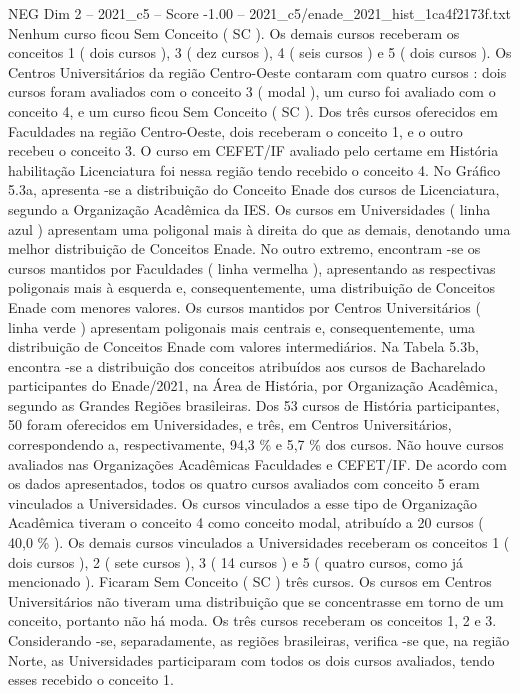 \begin{textsample}{NEG Dim 2 – 2021\_c5 – Score -1.00 – 2021\_c5/enade\_2021\_hist\_1ca4f2173f.txt}
Nenhum curso ficou Sem Conceito ( SC ).
Os demais cursos receberam os conceitos 1 ( dois cursos ), 3 ( dez cursos ), 4 ( seis cursos ) e 5 ( dois cursos ).
Os Centros Universitários da região Centro-Oeste contaram com quatro cursos : dois cursos foram avaliados com o conceito 3 ( modal ), um curso foi avaliado com o conceito 4, e um curso ficou Sem Conceito ( SC ).
Dos três cursos oferecidos em Faculdades na região Centro-Oeste, dois receberam o conceito 1, e o outro recebeu o conceito 3.
O curso em CEFET/IF avaliado pelo certame em História habilitação Licenciatura foi nessa região tendo recebido o conceito 4.
No Gráfico 5.3a, apresenta -se a distribuição do Conceito Enade dos cursos de Licenciatura, segundo a Organização Acadêmica da IES.
Os cursos em Universidades ( linha azul ) apresentam uma poligonal mais à direita do que as demais, denotando uma melhor distribuição de Conceitos Enade.
No outro extremo, encontram -se os cursos mantidos por Faculdades ( linha vermelha ), apresentando as respectivas poligonais mais à esquerda e, consequentemente, uma distribuição de Conceitos Enade com menores valores.
Os cursos mantidos por Centros Universitários ( linha verde ) apresentam poligonais mais centrais e, consequentemente, uma distribuição de Conceitos Enade com valores intermediários.
Na Tabela 5.3b, encontra -se a distribuição dos conceitos atribuídos aos cursos de Bacharelado participantes do Enade/2021, na Área de História, por Organização Acadêmica, segundo as Grandes Regiões brasileiras.
Dos 53 cursos de História participantes, 50 foram oferecidos em Universidades, e três, em Centros Universitários, correspondendo a, respectivamente, 94,3 \% e 5,7 \% dos cursos.
Não houve cursos avaliados nas Organizações Acadêmicas Faculdades e CEFET/IF.
De acordo com os dados apresentados, todos os quatro cursos avaliados com conceito 5 eram vinculados a Universidades.
Os cursos vinculados a esse tipo de Organização Acadêmica tiveram o conceito 4 como conceito modal, atribuído a 20 cursos ( 40,0 \% ).
Os demais cursos vinculados a Universidades receberam os conceitos 1 ( dois cursos ), 2 ( sete cursos ), 3 ( 14 cursos ) e 5 ( quatro cursos, como já mencionado ).
Ficaram Sem Conceito ( SC ) três cursos.
Os cursos em Centros Universitários não tiveram uma distribuição que se concentrasse em torno de um conceito, portanto não há moda.
Os três cursos receberam os conceitos 1, 2 e 3.
Considerando -se, separadamente, as regiões brasileiras, verifica -se que, na região Norte, as Universidades participaram com todos os dois cursos avaliados, tendo esses recebido o conceito 1.

\end{textsample}

